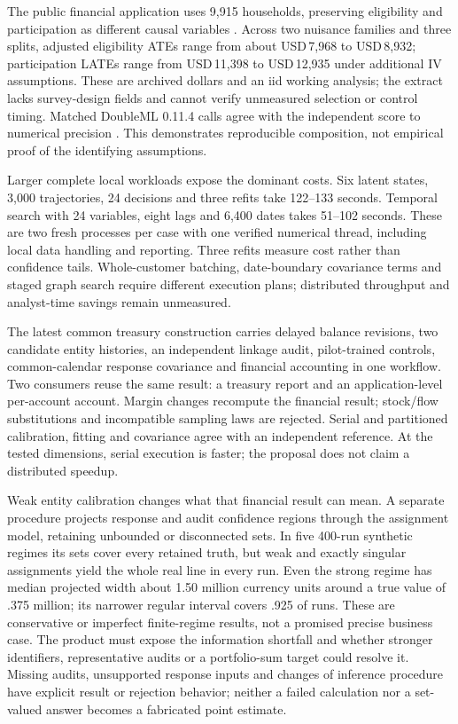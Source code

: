 \documentclass[11pt,a4paper,openany]{book}
\begin{document}
The public financial application uses 9,915 households, preserving eligibility
and participation as different causal variables \citep{dml2018,public401k}.
Across two nuisance families and three splits, adjusted eligibility ATEs
range from about USD\,7,968 to USD\,8,932; participation LATEs range from
USD\,11,398 to USD\,12,935 under additional IV assumptions. These are
archived dollars and an iid working analysis; the extract lacks survey-design
fields and cannot verify unmeasured selection or control timing. Matched
DoubleML 0.11.4 calls agree with the independent score to numerical precision
\citep{runtime_doubleml_scope}. This demonstrates reproducible composition,
not empirical proof of the identifying assumptions.

Larger complete local workloads expose the dominant costs. Six latent
states, 3,000 trajectories, 24 decisions and three refits take 122--133
seconds. Temporal search with 24 variables, eight lags and 6,400 dates takes
51--102 seconds. These are two fresh processes per case with one verified
numerical thread, including local data handling and reporting. Three refits
measure cost rather than confidence tails. Whole-customer batching,
date-boundary covariance terms and staged graph search require different
execution plans; distributed throughput and analyst-time savings remain
unmeasured.

The latest common treasury construction carries delayed balance revisions,
two candidate entity histories, an independent linkage audit, pilot-trained
controls, common-calendar response covariance and financial accounting in
one workflow. Two consumers reuse the same result: a treasury report and
an application-level per-account account. Margin changes recompute the
financial result; stock/flow substitutions and incompatible sampling laws
are rejected. Serial and partitioned calibration, fitting and covariance
agree with an independent reference. At the tested dimensions, serial
execution is faster; the proposal does not claim a distributed speedup.

Weak entity calibration changes what that financial result can mean. A
separate procedure projects response and audit confidence regions through
the assignment model, retaining unbounded or disconnected sets. In five
400-run synthetic regimes its sets cover every retained truth, but weak
and exactly singular assignments yield the whole real line in every run.
Even the strong regime has median projected width about 1.50 million
currency units around a true value of .375 million; its narrower regular
interval covers .925 of runs. These are conservative or imperfect
finite-regime results, not a promised precise business case. The product
must expose the information shortfall and whether stronger identifiers,
representative audits or a portfolio-sum target could resolve it. Missing
audits, unsupported response inputs and changes of inference procedure
have explicit result or rejection behavior; neither a failed calculation
nor a set-valued answer becomes a fabricated point estimate.
\end{document}
